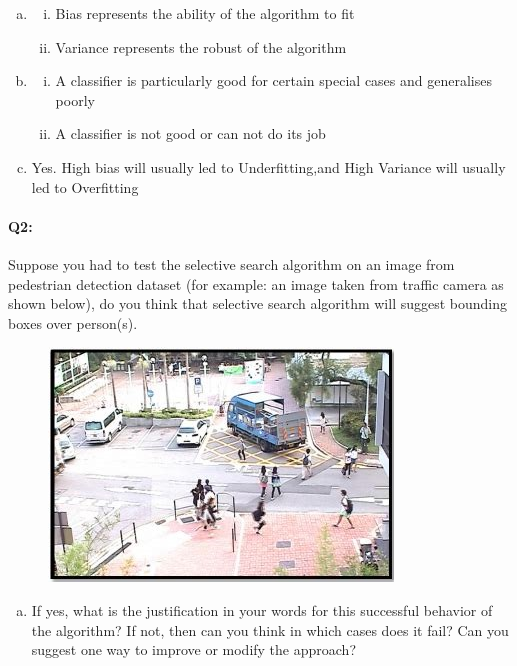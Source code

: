  \begin{enumerate}[(a)]

 \item 
     \begin{enumerate} [(i)]
     \item Bias represents the ability of the algorithm to fit 
     \item Variance represents the robust of the algorithm 
     \end{enumerate}

 \item 
     \begin{enumerate} [(i)]
     \item A classifier is particularly good for certain special cases and generalises poorly
     \item  A classifier is not good or can not do its job
     \end{enumerate}
 \item Yes. High bias will usually led to Underfitting,and High Variance will usually led to Overfitting

 \end{enumerate}



\pagebreak
\paragraph{Q2:} Suppose you had to test the selective search algorithm on an image from pedestrian detection dataset (for example: an image taken from traffic camera as shown below), do you think that selective search algorithm will suggest bounding boxes over person(s). 
\begin{figure}[!h]
	\centering
	\includegraphics{pedestrian.jpg}
\end{figure}
\begin{enumerate}[(a)]
    \item 
	If yes, what is the justification in your words for this successful behavior of the algorithm? If not, then can you think in which cases does it fail? Can you suggest one way to improve or modify the approach?

    

\end{enumerate}


